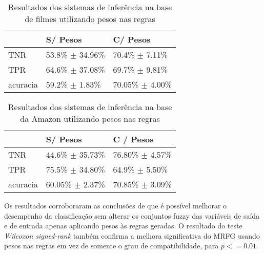 \documentclass[template.tex]{subfiles}
\begin{document}
\begin{table}[!h]
    \begin{tabular}{lll}
    ~                   & S/ Pesos                              & C/ Pesos \\ \hline
    TNR                 & 53.8\% $\pm$ 34.96\%      & 70.4\% $\pm$ 7.11\%    \\
    TPR             & 64.6\% $\pm$ 37.08\%      & 69.7\% $\pm$ 9.81\%   \\   
    acuracia        & 59.2\% $\pm$ 1.83\%       & 70.05\% $\pm$ 4.00\%    \\
    \end{tabular}
    \caption{Resultados dos sistemas de inferência na base de filmes utilizando pesos nas regras}
    \label{table:movies2_pesos}
\end{table}

%
%
%

\begin{table}[!h]
    \begin{tabular}{lll}
    ~                   & S/ Pesos                                  & C / Pesos \\ \hline
    TNR                 & 44.6\% $\pm$ 35.73\%      & 76.80\% $\pm$ 4.57\%    \\
    TPR             & 75.5\% $\pm$ 34.80\%      & 64.9\% $\pm$ 5.50\%    \\
    acuracia        & 60.05\% $\pm$ 2.37\%      & 70.85\% $\pm$ 3.09\%   \\
    \end{tabular}
    \caption{Resultados dos sistemas de inferência na base da Amazon utilizando pesos nas regras}
    \label{table:amazon2_pesos}
\end{table}

%
%
%

Os resultados corroboraram as conclusões de \cite{ishibuchi2001effect} que é possível melhorar o desempenho da classificação sem alterar os conjuntos fuzzy das variáveis de saída e de entrada apenas aplicando pesos às regras geradas. O resultado do teste \textit{Wilcoxon signed-rank} também confirma a melhora significativa do MRFG usando pesos nas regras em vez de somente o grau de compatibilidade, para $p <= 0.01$.
\end{document}
